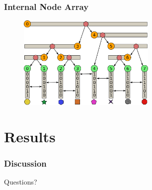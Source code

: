 \documentclass{beamer}
\begin{document}
\begin{frame}
  \frametitle{Internal Node Array}
\begin{figure}
\includegraphics[height=45mm]{radix_array.png}
\end{figure}
\end{frame}






\section{Results}

%  
%
%

\begin{frame}
  \frametitle{Discussion}
Questions?
\end{frame}
\end{document}

